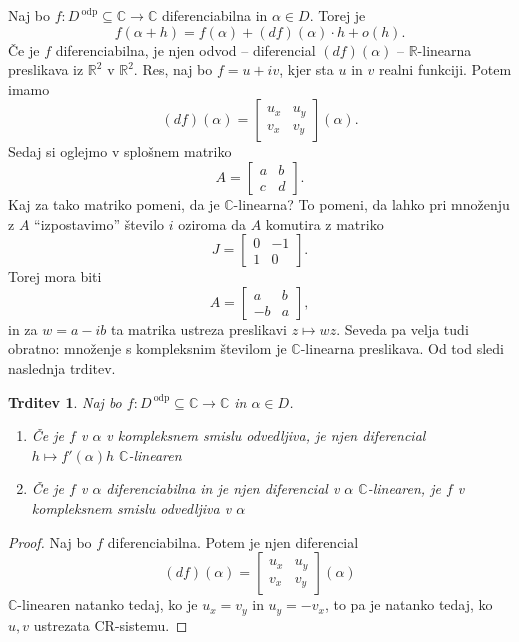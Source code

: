 \documentclass[10pt, a4paper]{article}
\newtheorem{trditev}[izr]{Trditev}
\newenvironment{noticeC}{%
  \tcolorbox[%
  notitle,
  empty,
  enhanced,  %
  breakable,
  coltext=black, 
  fontupper=\rmfamily,
  parbox=false,
  noparskip,
  sharp corners,
  boxrule=-1pt,  %
  frame hidden,
  left=7pt,  %
  right=7pt,
  top=5pt,
  bottom=5pt,
  before skip=2.5ex plus 2pt,
  after skip=2.5ex plus 2pt,
  overlay unbroken and last={%
  },
  ]}
{\endtcolorbox}
\newenvironment{dokaz}%
  {\begin{noticeC}\begin{proof}}%
  {\end{proof}\end{noticeC}}
\newcommand{\R}{\mathbb {R}}
\newcommand{\C}{\mathbb {C}}
\begin{document}
Naj bo $f: D^{\ \text{odp}} \subseteq \C \to \C$ diferenciabilna
in $\alpha \in D$. Torej je 
$$f(\alpha + h) = f(\alpha) + (df)(\alpha) \cdot h + o(h).$$
Če je $f$ diferenciabilna, je njen odvod -- diferencial $(df)(\alpha)$ -- $\R$-linearna
preslikava iz $\R^2$ v $\R^2$. Res, naj bo $f = u + iv$, kjer sta $u$ in $v$ realni funkciji.
Potem imamo $$(df)(\alpha) = \begin{bmatrix}
  u_x & u_y\\
  v_x & v_y
\end{bmatrix} (\alpha).$$
Sedaj si oglejmo v splošnem matriko 
$$A = \begin{bmatrix}
  a & b\\
  c & d
\end{bmatrix}.$$
Kaj za tako matriko pomeni, da je $\C$-linearna?
To pomeni, da lahko pri množenju z $A$ "`izpostavimo"' število $i$
oziroma da $A$ komutira z matriko 
$$J = \begin{bmatrix}
  0 & -1\\
  1 & 0
\end{bmatrix}.$$ 
Torej mora biti 
$$A = \begin{bmatrix}
  a & b\\
  -b & a
\end{bmatrix},$$
in za $w = a - ib$ ta matrika ustreza 
preslikavi $z \mapsto wz$. Seveda pa velja tudi obratno:
množenje s kompleksnim številom je $\C$-linearna preslikava.
Od tod sledi naslednja trditev.

\begin{trditev}
  Naj bo $f: D^{\ \text{odp}} \subseteq \C \to \C$ in $\alpha \in D$.
  \begin{enumerate}
    \item Če je $f$ v $\alpha$ v kompleksnem smislu odvedljiva, je njen diferencial $h \mapsto f'( \alpha) h$ $\C$-linearen
    \item Če je $f$ v $\alpha$ diferenciabilna in je njen diferencial v $\alpha$ $\C$-linearen,
    je $f$ v kompleksnem smislu odvedljiva v $\alpha$
  \end{enumerate}
\end{trditev}

\begin{dokaz}
  Naj bo $f$ diferenciabilna. Potem je njen diferencial 
  $$(df)(\alpha) = \begin{bmatrix}
    u_x & u_y\\
    v_x & v_y
  \end{bmatrix} (\alpha)$$
  $\C$-linearen natanko tedaj, ko je $u_x = v_y$ in $u_y = - v_x$,
  to pa je natanko tedaj, ko $u, v$ ustrezata CR-sistemu.
\end{dokaz}
\end{document}
